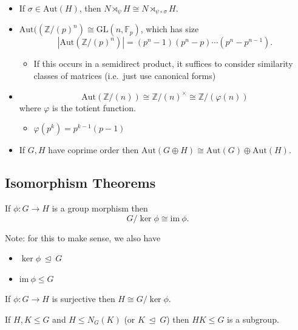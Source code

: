 \begin{itemize}
\item
  If \(\sigma \in {\mathrm{Aut}}(H)\), then
  \(N \rtimes_\psi H \cong N \rtimes_{\psi \circ \sigma} H\).
\item
  \({\mathrm{Aut}}(({\mathbb{Z}}/(p)^n) \cong \mathrm{GL}(n, {\mathbb{F}}_p)\),
  which has size \[  
  {\left\lvert {{\mathrm{Aut}}({\mathbb{Z}}/(p)^n)} \right\rvert} = (p^n-1)(p^n-p)\cdots(p^n-p^{n-1})
  .\]

  \begin{itemize}
  \tightlist
  \item
    If this occurs in a semidirect product, it suffices to consider
    similarity classes of matrices (i.e.~just use canonical forms)
  \end{itemize}
\item
  \[ {\mathrm{Aut}}({\mathbb{Z}}/(n)) \cong {\mathbb{Z}}/(n)^{\times}\cong {\mathbb{Z}}/({\varphi(n)})\]
  where \(\varphi\) is the totient function.

  \begin{itemize}
  \tightlist
  \item
    \(\varphi(p^k) = p^{k-1}(p-1)\)
  \end{itemize}
\item
  If \(G, H\) have coprime order then
  \({\mathrm{Aut}}(G\oplus H) \cong {\mathrm{Aut}}(G) \oplus {\mathrm{Aut}}(H)\).
\end{itemize}

\hypertarget{isomorphism-theorems}{%
\subsection{Isomorphism Theorems}\label{isomorphism-theorems}}

If \(\phi:G\longrightarrow H\) is a group morphism then
\[G/\ker \phi \cong {\text{im}~}\phi.\]

Note: for this to make sense, we also have

\begin{itemize}
\tightlist
\item
  \(\ker \phi {~\trianglelefteq~}G\)
\item
  \({\text{im}~}\phi \leq G\)
\end{itemize}

If \(\phi: G\longrightarrow H\) is surjective then
\(H\cong G/\ker \phi\).

If \(H,K \leq G\) and \(H \leq N_G(K)\) (or \(K {~\trianglelefteq~}G\))
then \(HK \leq G\) is a subgroup.

